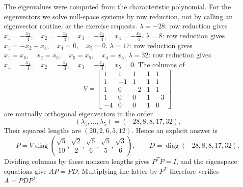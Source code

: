 The eigenvalues were computed from the characteristic polynomial. For
the eigenvectors we solve null-space systems by row reduction, not by
calling an eigenvector routine, as the exercise requests.
$\lambda=-28$: row reduction gives \(x_{1}=- \frac{x_{5}}{4},\quad x_{2}=- \frac{x_{5}}{4},\quad x_{3}=- \frac{x_{5}}{4},\quad x_{4}=- \frac{x_{5}}{4}\).
$\lambda=8$: row reduction gives \(x_{1}=- x_{2} - x_{3},\quad x_{4}=0,\quad x_{5}=0\).
$\lambda=17$: row reduction gives \(x_{1}=x_{5},\quad x_{2}=x_{5},\quad x_{3}=x_{5},\quad x_{4}=x_{5}\).
$\lambda=32$: row reduction gives \(x_{1}=- \frac{x_{4}}{3},\quad x_{2}=- \frac{x_{4}}{3},\quad x_{3}=- \frac{x_{4}}{3},\quad x_{5}=0\).
The columns of
\[
 V=\begin{bmatrix}1&1&1&1&1\\1&-1&1&1&1\\1&0&-2&1&1\\1&0&0&1&-3\\-4&0&0&1&0\end{bmatrix}
\]
are mutually orthogonal eigenvectors in the order
\[
 (\lambda_1,\ldots,\lambda_5)=(-28,8,8,17,32).
\]
Their squared lengths are $(20,2,6,5,12)$. Hence an explicit answer is
\[
 P=V\operatorname{diag}(\frac{\sqrt{5}}{10},\frac{\sqrt{2}}{2},\frac{\sqrt{6}}{6},\frac{\sqrt{5}}{5},\frac{\sqrt{3}}{6}),\qquad
 D=\operatorname{diag}(-28,8,8,17,32).
\]
Dividing columns by these nonzero lengths gives $P^TP=I$, and the
eigenspace equations give $AP=PD$. Multiplying the latter by $P^T$
therefore verifies $A=PDP^T$.
